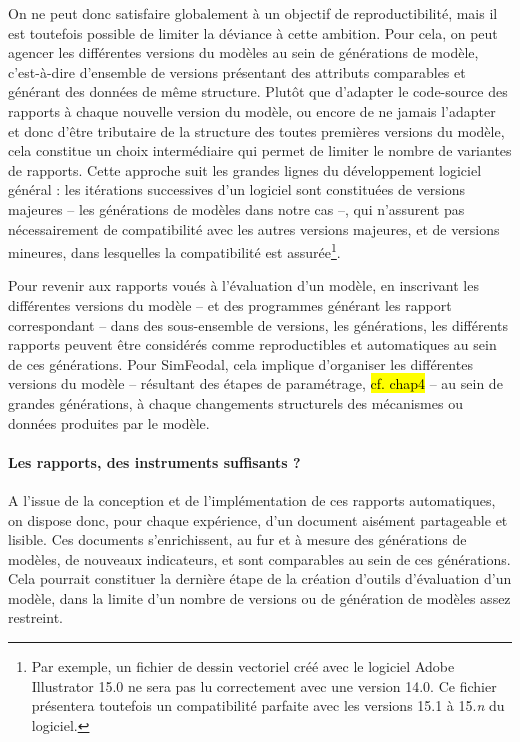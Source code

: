 	On ne peut donc satisfaire globalement à un objectif de reproductibilité, mais il est toutefois possible de limiter la déviance à cette ambition.
	Pour cela, on peut agencer les différentes versions du modèles au sein de \og générations\fg{} de modèle, c'est-à-dire d'ensemble de versions présentant des attributs comparables et générant des données de même structure.
	Plutôt que d'adapter le code-source des rapports à chaque nouvelle version du modèle, ou encore de ne jamais l'adapter et donc d'être tributaire de la structure des toutes premières versions du modèle, cela constitue un choix intermédiaire qui permet de limiter le nombre de variantes de rapports.
	Cette approche suit les grandes lignes du développement logiciel général : les itérations successives d'un logiciel sont constituées de versions \og majeures\fg{} -- les générations de modèles dans notre cas --, qui n'assurent pas nécessairement de compatibilité avec les autres versions majeures, et de versions \og mineures\fg{}, dans lesquelles la compatibilité est assurée\footnote{
		Par exemple, un fichier de dessin vectoriel créé avec le logiciel Adobe Illustrator 15.0 ne sera pas lu correctement avec une version 14.0.
		Ce fichier présentera toutefois un compatibilité parfaite avec les versions 15.1 à 15.\textit{n} du logiciel.
	}.
	
	Pour revenir aux rapports voués à l'évaluation d'un modèle, en inscrivant les différentes versions du modèle -- et des programmes générant les rapport correspondant -- dans des sous-ensemble de versions, les \og générations\fg{}, les différents rapports peuvent être considérés comme reproductibles et automatiques au sein de ces générations.
	Pour SimFeodal, cela implique d'organiser les différentes versions du modèle -- résultant des étapes de paramétrage, \hl{cf. chap4} -- au sein de grandes générations, à chaque changements structurels des mécanismes ou données produites par le modèle.
	
	\paragraph{Les rapports, des instruments suffisants ?}
	
	A l'issue de la conception et de l'implémentation de ces rapports automatiques, on dispose donc, pour chaque expérience, d'un document aisément partageable et lisible.
	Ces documents s'enrichissent, au fur et à mesure des générations de modèles, de nouveaux indicateurs, et sont comparables au sein de ces générations.
	Cela pourrait constituer la dernière étape de la création d'outils d'évaluation d'un modèle, dans la limite d'un nombre de versions ou de génération de modèles assez restreint.
	
